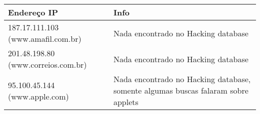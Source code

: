 \begin{table}[h]
\begin{tabular}{|l|l|}
\hline
Endereço IP & Info \\ \hline
187.17.111.103 (www.amafil.com.br) & Nada encontrado no Hacking database \\ \hline
201.48.198.80 (www.correios.com.br) & Nada encontrado no Hacking database \\ \hline
95.100.45.144 (www.apple.com) & Nada encontrado no Hacking database, somente algumas buscas falaram sobre applets \\ \hline
\end{tabular}
\end{table}